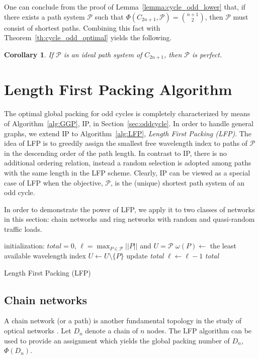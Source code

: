 \documentclass[journal,draftcls,onecolumn,12pt,twoside]{IEEEtran}
\newtheorem{corollary}[theorem]{\bf Corollary}
\renewcommand{\d}{\displaystyle}
\begin{document}
One can conclude from the proof of Lemma~\ref{lemma:cycle_odd_lower} that, if there exists a path system $\mathcal{P}$ such that $\Phi(C_{2n+1},\mathcal{P})={n+1\choose 2}$, then $\mathcal{P}$ must consist of shortest paths.
Combining this fact with Theorem~\ref{th:cycle_odd_optimal} yields the following.

\begin{corollary}\label{coro:odd}
If $\mathcal{P}$ is an ideal path system of $C_{2n+1}$, then $\mathcal{P}$ is perfect.
\end{corollary}

\section{Length First Packing Algorithm}\label{sec:simulation}
The optimal global packing for odd cycles is completely characterized by means of Algorithm~\ref{alg:GGP}, IP, in Section~\ref{sec:oddcycle}.
In order to handle general graphs, we extend IP to Algorithm~\ref{alg:LFP}, \emph{Length First Packing (LFP)}.
The idea of LFP is to greedily assign the smallest free wavelength index to paths of $\mathcal{P}$ in the descending order of the path length.
In contrast to IP, there is no additional ordering relation, instead a random selection
is adopted among paths with the same length in the LFP scheme.
Clearly, IP can be viewed as a special case of LFP when the objective, $\mathcal{P}$, is the (unique) shortest path system of an odd cycle.

In order to demonstrate the power of LFP, we apply it to two classes of networks
in this section: chain networks and ring networks with random and quasi-random traffic
loads.

\begin{algorithm}\SetAlgoLined
  initialization: $total=0$, $\d\ell=\max_{P\in\mathcal{P}}||P||$ and $U=\mathcal{P}$ \;
  {
 	{
 		{
 		$\omega(P) \gets$ the least available wavelength index\;
 		$U\gets U\setminus\{P\}$\;
 		}
 	}
 	update \emph{total} \;
    $\ell\gets \ell-1$\;
  }
    \Return \emph{total}\;
  \caption{Length First Packing (LFP)}
  \label{alg:LFP}
\end{algorithm}

\subsection{Chain networks}
A chain network (or a path) is another fundamental topology in the study of optical networks \cite{Agbinya_06}.
Let $D_n$ denote a chain of $n$ nodes.
The LFP algorithm can be used to provide an assignment which yields
the global packing number of $D_n$, $\Phi(D_n)$.
\end{document}
